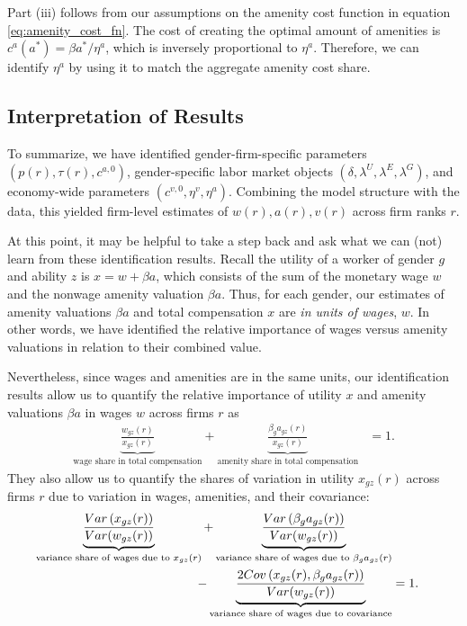 Part (iii) follows from our assumptions on the amenity cost function in equation \eqref{eq:amenity_cost_fn}. The cost of creating the optimal amount of amenities is $c^{a}(a^{*}) = \beta a^{*}/\eta^{a}$, which is inversely proportional to $\eta^{a}$. Therefore, we can identify $\eta^{a}$ by using it to match the aggregate amenity cost share.


\subsection{Interpretation of Results\label{subsec:interpretation}}

To summarize, we have identified gender-firm-specific parameters $(p(r), \tau(r), c^{a,0})$, %
gender-specific labor market objects $(\delta, \lambda^{U}, \lambda^{E}, \lambda^{G})$, %
and economy-wide parameters $(c^{v,0}, \eta^{v}, \eta^{a})$. Combining the model structure with the data, this yielded firm-level estimates of $w(r), a(r), v(r)$ across firm ranks $r$.

At this point, it may be helpful to take a step back and ask what we can (not) learn from these identification results. Recall the utility of a worker of gender $g$ and ability $z$ is $x = w + \beta a$, which consists of the sum of the monetary wage $w$ and the nonwage amenity valuation $\beta a$. Thus, for each gender, our estimates of amenity valuations $\beta a$ and total compensation $x$ are \emph{in units of wages}, $w$. In other words, we have identified the relative importance of wages versus amenity valuations in relation to their combined value.

Nevertheless, since wages and amenities are in the same units, our identification results allow us to quantify the relative importance of utility $x$ and amenity valuations $\beta a$ in wages $w$ across firms $r$ as
%
\begin{align}
    \underbrace{\frac{w_{gz}(r)}{x_{gz}(r)}}_{\text{wage share in total compensation}} + \underbrace{\frac{\beta_{g} a_{gz}(r)}{x_{gz}(r)}}_{\text{amenity share in total compensation}} &= 1. \label{eq:w_share} %
\end{align}
%
They also allow us to quantify the shares of variation in utility $x_{gz}(r)$ across firms $r$ due to variation in wages, amenities, and their covariance:
%
\begin{align}
    \underbrace{\frac{Var \left( x_{gz}(r) \right)}{Var(w_{gz}(r))}}_{\text{variance share of wages due to $x_{gz}(r)$}} + \underbrace{\frac{Var \left( \beta_{g} a_{gz}(r) \right)}{Var(w_{gz}(r))}}_{\text{variance share of wages due to $\beta_{g} a_{gz}(r)$}} \label{eq:var_decomp_w} \\
    - \underbrace{\frac{2Cov \left( x_{gz}(r) , \beta_{g} a_{gz}(r) \right)}{Var(w_{gz}(r))}}_{\text{variance share of wages due to covariance}} &= 1. \notag
\end{align}
%

